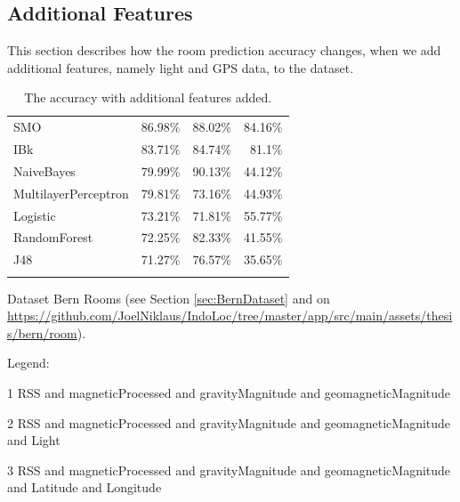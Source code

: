 \subsection{Additional Features}
\label{AdditionalFeatures}

This section describes how the room prediction accuracy changes, when we add additional features, namely light and GPS data, to the dataset.

\begin{table}[H]
	\begin{threeparttable}
		\caption{The accuracy with additional features added.}
		\label{tab:AdditionalFeatures}
		\centering
		\begin{tabular}{l r r r}
		\toprule
		\tabhead{Classifier} & \tabhead{1} & \tabhead{2} & \tabhead{3} \\
		\midrule
		
SMO &	86.98\%	&	88.02\%	&	84.16\% \\IBk	& 83.71\%	&	84.74\%	&	81.1\% \\NaiveBayes &	79.99\%	&	90.13\%	&	44.12\% \\MultilayerPerceptron &	79.81\%	&	73.16\%	&	44.93\% \\Logistic &	73.21\%	&	71.81\%	&	55.77\% \\RandomForest &	72.25\%	&	82.33\%	&	41.55\% \\J48 &	71.27\%	&	76.57\%	&	35.65\% \\
				
		\bottomrule\\
		\end{tabular}
		\begin{tablenotes}
      \small
      \item Dataset Bern Rooms (see Section \ref{sec:BernDataset} and on \url{https://github.com/JoelNiklaus/IndoLoc/tree/master/app/src/main/assets/thesis/bern/room}).
      \item Legend:
      \item[1] RSS and magneticProcessed and gravityMagnitude and geomagneticMagnitude
\item[2] RSS and magneticProcessed and gravityMagnitude and geomagneticMagnitude and Light
\item[3] RSS and magneticProcessed and gravityMagnitude and geomagneticMagnitude and Latitude and Longitude
    \end{tablenotes}
	\end{threeparttable}
\end{table} 

